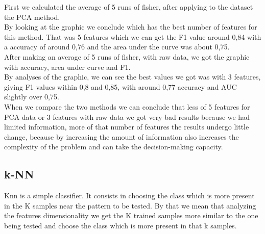 \documentclass[english, a4paper, 12pt]{article}
\newcommand{\tab}{\hspace*{2em}}
\begin{document}
\tab First we calculated the average of 5 runs of fisher, after applying to the dataset the PCA method.\smallskip\\
\tab By looking at the graphic we conclude which has the best number of features for this method. That was 5 features which we can get the F1 value around 0,84 with a accuracy of around 0,76 and the area under the curve was about 0,75.\smallskip\\
\tab After making an average of 5 runs of fisher, with raw data, we got the graphic with accuracy, area under curve and F1.\smallskip\\
\tab By analyses of the graphic, we can see the best values we got was with 3 features, giving F1 values within 0,8 and 0,85, with around 0,77 accuracy and AUC slightly over 0,75.\smallskip\\
\tab When we compare the two methods we can conclude that less of 5 features for PCA data or 3 features with raw data we got very bad results because we had limited information, more of that number of features the results undergo little change, because by increasing the amount of information also increases the complexity of the problem and can take the decision-making capacity.\smallskip\\

\pagebreak
\subsection{k-NN}
\tab Knn is a simple classifier. It consists in choosing the class which is more present in the K samples near the pattern to be tested. By that we mean that analyzing the features dimensionality we get the K trained samples more similar to the one being tested and choose the class which is more present in that k samples.\smallskip\\
\end{document}
